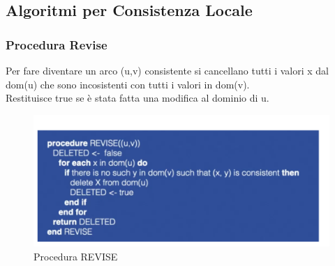 \subsection{Algoritmi per Consistenza Locale}
\subsubsection{Procedura Revise}
Per fare diventare un arco (u,v) consistente si cancellano tutti i valori x dal dom(u) che sono incosistenti con tutti i valori in dom(v).
\\Restituisce true se è stata fatta una modifica al dominio di u.
\begin{figure}[htp]
	\centering
    \includegraphics[width=13cm, keepaspectratio]{img/Cap3/revise.png}
    \caption{Procedura REVISE}
\end{figure}
\newpage
